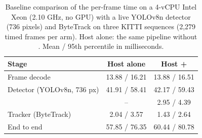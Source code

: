 \begin{table}[t]
\caption{Baseline comparison of the per-frame time on a 4-vCPU Intel Xeon
(2.10 GHz, no GPU) with a live YOLOv8n detector (736 pixels) and ByteTrack on
three KITTI sequences (2,279 timed frames per arm). Host alone: the same
pipeline without \scl{}. Mean / 95th percentile in milliseconds.}
\label{tab:runtime}
\centering\footnotesize
\setlength{\tabcolsep}{4pt}
\begin{tabular}{@{}lcc@{}}
\toprule
Stage & Host alone & Host + \scl{}\\
\midrule
Frame decode & 13.88 / 16.21 & 13.88 / 16.51\\
Detector (YOLOv8n, 736 px) & 41.91 / 58.41 & 42.17 / 59.43\\
\scl{} & -- & 2.95 / 4.39\\
Tracker (ByteTrack) & 2.04 / 3.57 & 1.43 / 2.64\\
End to end & 57.85 / 76.35 & 60.44 / 80.78\\
\bottomrule
\end{tabular}
\end{table}

